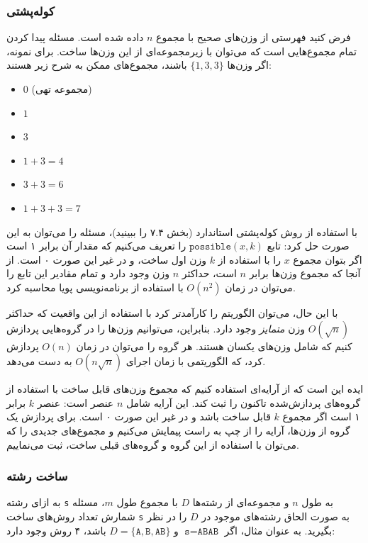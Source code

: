 \subsubsection{کوله‌پشتی}

فرض کنید فهرستی از وزن‌های صحیح با مجموع $n$ داده شده است.
مسئله پیدا کردن تمام مجموع‌هایی است که می‌توان با زیرمجموعه‌ای از این وزن‌ها ساخت. برای نمونه، اگر وزن‌ها $\{1,3,3\}$ باشند، مجموع‌های ممکن به شرح زیر هستند:

\begin{itemize}[noitemsep]
\item $0$ (مجموعه تهی)
\item $1$
\item $3$
\item $1+3=4$
\item $3+3=6$
\item $1+3+3=7$
\end{itemize}

با استفاده از روش کوله‌پشتی استاندارد (بخش ۷.۴ را ببینید)،
مسئله را می‌توان به این صورت حل کرد:
تابع $\texttt{possible}(x,k)$ را تعریف می‌کنیم که مقدار آن برابر ۱ است
اگر بتوان مجموع $x$ را با استفاده از $k$ وزن اول ساخت،
و در غیر این صورت ۰ است.
از آنجا که مجموع وزن‌ها برابر $n$ است،
حداکثر $n$ وزن وجود دارد و
تمام مقادیر این تابع را می‌توان
در زمان $O(n^2)$ با استفاده از برنامه‌نویسی پویا محاسبه کرد.

با این حال، می‌توان الگوریتم را کارآمدتر کرد
با استفاده از این واقعیت که حداکثر $O(\sqrt n)$
وزن \emph{متمایز} وجود دارد.
بنابراین، می‌توانیم وزن‌ها را در گروه‌هایی پردازش کنیم
که شامل وزن‌های یکسان هستند.
هر گروه را می‌توان
در زمان $O(n)$ پردازش کرد، که الگوریتمی با زمان اجرای $O(n \sqrt n)$ به دست می‌دهد.

ایده این است که از آرایه‌ای استفاده کنیم که مجموع وزن‌های قابل ساخت
با استفاده از گروه‌های پردازش‌شده تاکنون را ثبت کند.
این آرایه شامل $n$ عنصر است: عنصر $k$ برابر ۱ است اگر مجموع
$k$ قابل ساخت باشد و در غیر این صورت ۰ است.
برای پردازش یک گروه از وزن‌ها، آرایه را
از چپ به راست پیمایش می‌کنیم و مجموع‌های جدیدی را که
می‌توان با استفاده از این گروه و گروه‌های قبلی ساخت، ثبت می‌نماییم.

\subsubsection{ساخت رشته}

به ازای رشته \texttt{s} به طول $n$
و مجموعه‌ای از رشته‌ها $D$ با مجموع طول $m$،
مسئله شمارش تعداد روش‌های ساخت
\texttt{s} به صورت الحاق رشته‌های موجود در $D$ را در نظر بگیرید.
به عنوان مثال،
اگر $\texttt{s}=\texttt{ABAB}$ و
$D=\{\texttt{A},\texttt{B},\texttt{AB}\}$ باشد،
۴ روش وجود دارد:

